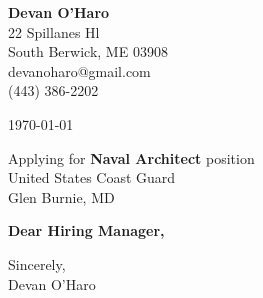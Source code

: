 \documentclass[12pt]{article}
\makeatletter
\newcommand{\yourname}{Devan O'Haro}
\newcommand{\youraddress}{22 Spillanes Hl}
\newcommand{\yourcitystatezip}{South Berwick, ME 03908}
\newcommand{\youremail}{devanoharo@gmail.com}
\newcommand{\yourphone}{(443) 386-2202}
\newcommand{\dateofletter}{\today}
\newcommand{\recipient}{Hiring Manager}
\newcommand{\companyname}{United States Coast Guard}
\newcommand{\companycitystatezip}{Glen Burnie, MD}
\newcommand{\job}{Naval Architect}
\makeatother
\begin{document}
\noindent
\begin{minipage}[t]{0.6\textwidth}
    \textbf{\yourname} \\
    \youraddress \\
    \yourcitystatezip \\
    \youremail \\
    \yourphone
\end{minipage}%
\hfill
\begin{minipage}[t]{0.35\textwidth}
    \raggedleft
    \dateofletter
\end{minipage}
\vspace{2em}

\noindent
Applying for \textbf{\job} position\\
\companyname \\
\companycitystatezip \\
\vspace{2em}

\noindent
\textbf{Dear \recipient,} \\
\vspace{1em}

\noindent
\vspace{1em}

\noindent
Sincerely, \\
\vspace{2em}
\yourname
\end{document}

